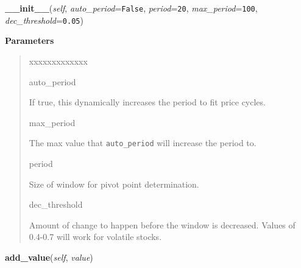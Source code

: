 \hspace{.8\funcindent}\begin{boxedminipage}{\funcwidth}

    \raggedright \textbf{\_\_init\_\_}(\textit{self}, \textit{auto\_period}={\tt False}, \textit{period}={\tt 20}, \textit{max\_period}={\tt 100}, \textit{dec\_threshold}={\tt 0.05})

\setlength{\parskip}{2ex}
\setlength{\parskip}{1ex}
      \textbf{Parameters}
      \vspace{-1ex}

      \begin{quote}
        \begin{Ventry}{xxxxxxxxxxxxx}

          \item[auto\_period]

          If true, this dynamically increases the period to fit price 
          cycles.

          \item[max\_period]

          The max value that \texttt{auto\_period} will increase the period
          to.

          \item[period]

          Size of window for pivot point determination.

          \item[dec\_threshold]

          Amount of change to happen before the window is decreased. Values
          of 0.4-0.7 will work for volatile stocks.

        \end{Ventry}

      \end{quote}

    \end{boxedminipage}

    \label{nukaquant:LocalExtrema:add_value}

    \vspace{0.5ex}

\hspace{.8\funcindent}\begin{boxedminipage}{\funcwidth}

    \raggedright \textbf{add\_value}(\textit{self}, \textit{value})

\setlength{\parskip}{2ex}
\setlength{\parskip}{1ex}
    \end{boxedminipage}

